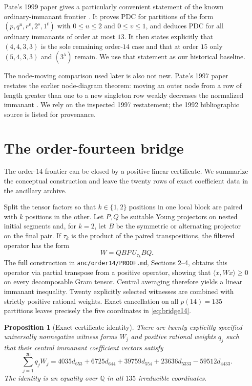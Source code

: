 \documentclass[11pt]{article}
\newtheorem{proposition}[theorem]{Proposition}
\theoremstyle{definition}
\begin{document}
Pate's 1999 paper gives a particularly convenient statement of the known ordinary-immanant frontier \cite{Pate1999}.  It proves PDC for partitions of the form $(p,q^u,r^v,2^s,1^t)$ with $0\le u\le2$ and $0\le v\le1$, and deduces PDC for all ordinary immanants of order at most $13$.  It then states explicitly that $(4,4,3,3)$ is the sole remaining order-$14$ case and that at order $15$ only $(5,4,3,3)$ and $(3^5)$ remain.  We use that statement as our historical baseline.

The node-moving comparison used later is also not new.  Pate's 1997 paper restates the earlier node-diagram theorem: moving an outer node from a row of length greater than one to a new singleton row weakly decreases the normalized immanant \cite{Pate1997,Pate1992}.  We rely on the inspected 1997 restatement; the 1992 bibliographic source is listed for provenance.

\section{The order-fourteen bridge}\label{sec:order14}
The order-$14$ frontier can be closed by a positive linear certificate.  We summarize the conceptual construction and leave the twenty rows of exact coefficient data in the ancillary archive.

Split the tensor factors so that $k\in\{1,2\}$ positions in one local block are paired with $k$ positions in the other.  Let $P,Q$ be suitable Young projectors on nested initial segments and, for $k=2$, let $B$ be the symmetric or alternating projector on the final pair.  If $\tau_k$ is the product of the paired transpositions, the filtered operator has the form
\[
 W=QBP\,U_{\tau_k}BQ.
\]
The full construction in \texttt{anc/order14/PROOF.md}, Sections 2--4, obtains this operator via partial transpose from a positive operator, showing that $\langle x,Wx\rangle\ge0$ on every decomposable Gram tensor.  Central averaging therefore yields a linear immanant inequality.  Twenty explicitly selected witnesses are combined with strictly positive rational weights.  Exact cancellation on all $p(14)=135$ partitions leaves precisely the five coordinates in \eqref{eq:bridge14}.

\begin{proposition}[Exact certificate identity]\label{prop:cert14}
There are twenty explicitly specified universally nonnegative witness forms $W_j$ and positive rational weights $q_j$ such that their central immanant coefficient vectors satisfy
\[
 \sum_{j=1}^{20}q_jW_j
 =4035d_{653}+6725d_{644}+39759d_{554}+23636d_{5333}-59512d_{4433}.
\]
The identity is an equality over $\mathbb Q$ in all $135$ irreducible coordinates.
\end{proposition}
\end{document}
